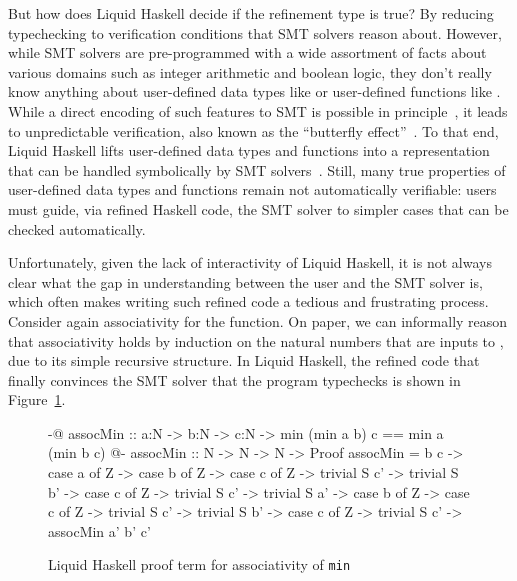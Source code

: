 But how does Liquid Haskell decide if the refinement type is true? By
reducing typechecking to verification conditions that SMT solvers
reason about. However, while SMT solvers are pre-programmed with a
wide assortment of facts about various domains such as integer
arithmetic and boolean logic, they don't really know anything about
user-defined data types like  or user-defined functions like
. While a direct encoding of such features to SMT is possible
in principle~\cite{HALO}, it leads to unpredictable verification, also
known as the ``butterfly effect''~\cite{LeinoP16}. To that end, Liquid
Haskell lifts user-defined data types and functions into a
representation that can be handled symbolically by SMT
solvers~\cite{VazouTCSNWJ18}. Still, many true properties of
user-defined data types and functions remain not automatically
verifiable: users must guide, via refined Haskell code, the SMT solver
to simpler cases that can be checked automatically.

Unfortunately, given the lack of interactivity of Liquid Haskell, it
is not always clear what the gap in understanding between the user and
the SMT solver is, which often makes writing such refined code a
tedious and frustrating process. Consider again associativity for the
 function. On paper, we can informally reason that
associativity holds by induction on the natural numbers that are inputs
to , due to its simple recursive structure. In Liquid Haskell,
the refined code that finally convinces the SMT solver that the
program typechecks is shown in Figure~\ref{fig:assoc-min-proof}.


\begin{figure}
\begin{code}
  {-@ assocMin :: a:N -> b:N -> c:N ->
        {min (min a b) c == min a (min b c)} @-}
  assocMin :: N -> N -> N -> Proof
  assocMin = \a b c ->
    case a of 
      Z ->
        case b of 
          Z ->
            case c of
              Z -> trivial
              S c' -> trivial
          S b' ->
            case c of
              Z -> trivial
              S c' -> trivial
    S a' ->
      case b of 
        Z ->
          case c of
            Z -> trivial
            S c' -> trivial
        S b' ->
          case c of
            Z -> trivial
            S c' -> assocMin a' b' c'
\end{code}
\caption{Liquid Haskell proof term for associativity of \texttt{min}}
\label{fig:assoc-min-proof}
\end{figure}


